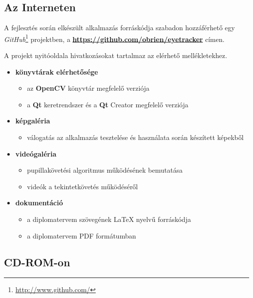 \subsection{Az Interneten}\label{sect:interneten}

A fejlesztés során elkészült alkalmazás forráskódja szabadon hozzáférhető egy \emph{GitHub}\footnote{\url{http://www.github.com/}} projektben, a \textbf{\url{https://github.com/obrien/eyetracker}} címen.

A projekt nyitóoldala hivatkozásokat tartalmaz az elérhető mellékletekhez. 

\begin{itemize}
    \item \textbf{könyvtárak elérhetősége}
    \begin{itemize}
      \item az \textbf{OpenCV} könyvtár megfelelő verziója
      \item a \textbf{Qt} keretrendszer és a \textbf{Qt} Creator megfelelő verziója
    \end{itemize}
    
  \item \textbf{képgaléria}
    \begin{itemize}
      \item válogatás az alkalmazás tesztelése és használata során készített képekből
    \end{itemize}
    
  \item \textbf{videógaléria}
    \begin{itemize}
      \item pupillakövetési algoritmus működésének bemutatása
      \item videók a tekintetkövetés működéséről
    \end{itemize}

  \item \textbf{dokumentáció}
    \begin{itemize}
      \item a diplomatervem szövegének \LaTeX{} nyelvű forráskódja
      \item a diplomatervem PDF formátumban
    \end{itemize}
\end{itemize}

\subsection{CD-ROM-on}\label{sect:cdromon}

